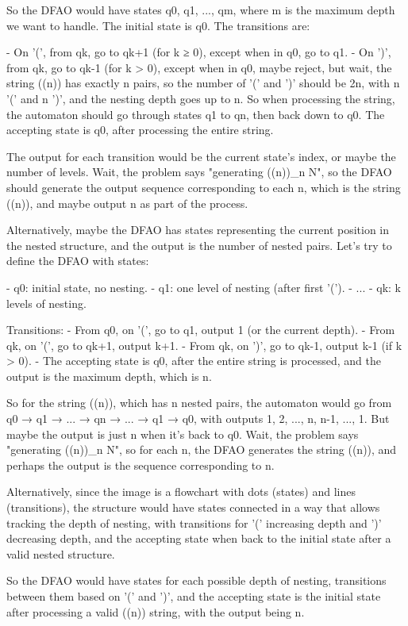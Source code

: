 So the DFAO would have states q0, q1, ..., qm, where m is the maximum depth we want to handle. The initial state is q0. The transitions are:

- On '(', from qk, go to qk+1 (for k ≥ 0), except when in q0, go to q1.
- On ')', from qk, go to qk-1 (for k > 0), except when in q0, maybe reject, but wait, the string ((n)) has exactly n pairs, so the number of '(' and ')' should be 2n, with n '(' and n ')', and the nesting depth goes up to n. So when processing the string, the automaton should go through states q1 to qn, then back down to q0. The accepting state is q0, after processing the entire string.

The output for each transition would be the current state's index, or maybe the number of levels. Wait, the problem says "generating ((n))_n N", so the DFAO should generate the output sequence corresponding to each n, which is the string ((n)), and maybe output n as part of the process.

Alternatively, maybe the DFAO has states representing the current position in the nested structure, and the output is the number of nested pairs. Let's try to define the DFAO with states:

- q0: initial state, no nesting.
- q1: one level of nesting (after first '(').
- ...
- qk: k levels of nesting.

Transitions:
- From q0, on '(', go to q1, output 1 (or the current depth).
- From qk, on '(', go to qk+1, output k+1.
- From qk, on ')', go to qk-1, output k-1 (if k > 0).
- The accepting state is q0, after the entire string is processed, and the output is the maximum depth, which is n.

So for the string ((n)), which has n nested pairs, the automaton would go from q0 → q1 → ... → qn → ... → q1 → q0, with outputs 1, 2, ..., n, n-1, ..., 1. But maybe the output is just n when it's back to q0. Wait, the problem says "generating ((n))_n N", so for each n, the DFAO generates the string ((n)), and perhaps the output is the sequence corresponding to n.

Alternatively, since the image is a flowchart with dots (states) and lines (transitions), the structure would have states connected in a way that allows tracking the depth of nesting, with transitions for '(' increasing depth and ')' decreasing depth, and the accepting state when back to the initial state after a valid nested structure.

So the DFAO would have states for each possible depth of nesting, transitions between them based on '(' and ')', and the accepting state is the initial state after processing a valid ((n)) string, with the output being n.

